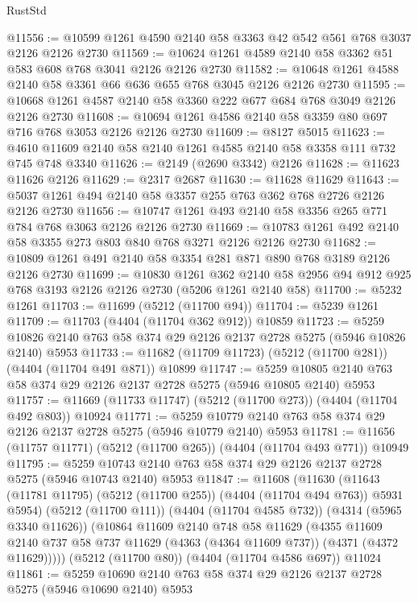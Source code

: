 \begin{lexlean}{RustStd}
\begin{coremodule}
{\begin{coremodule}
{{{{{{{{{{{{{{{{@11556 := @10599 @1261 @4590 @2140 @58 @3363 @42 @542 @561 @768 @3037 @2126 @2126 @2730
@11569 := @10624 @1261 @4589 @2140 @58 @3362 @51 @583 @608 @768 @3041 @2126 @2126 @2730
@11582 := @10648 @1261 @4588 @2140 @58 @3361 @66 @636 @655 @768 @3045 @2126 @2126 @2730
@11595 := @10668 @1261 @4587 @2140 @58 @3360 @222 @677 @684 @768 @3049 @2126 @2126 @2730
@11608 := @10694 @1261 @4586 @2140 @58 @3359 @80 @697 @716 @768 @3053 @2126 @2126 @2730
@11609 := @8127 @5015
@11623 := @4610 @11609 @2140 @58 @2140 @1261 @4585 @2140 @58 @3358 @111 @732 @745 @748 @3340
@11626 := @2149 (@2690 @3342) @2126
@11628 := @11623 @11626 @2126
@11629 := @2317 @2687
@11630 := @11628 @11629
@11643 := @5037 @1261 @494 @2140 @58 @3357 @255 @763 @362 @768 @2726 @2126 @2126 @2730
@11656 := @10747 @1261 @493 @2140 @58 @3356 @265 @771 @784 @768 @3063 @2126 @2126 @2730
@11669 := @10783 @1261 @492 @2140 @58 @3355 @273 @803 @840 @768 @3271 @2126 @2126 @2730
@11682 := @10809 @1261 @491 @2140 @58 @3354 @281 @871 @890 @768 @3189 @2126 @2126 @2730
@11699 := @10830
    @1261
    @362
    @2140
    @58
    @2956
    @94
    @912
    @925
    @768
    @3193
    @2126
    @2126
    @2730
    (@5206 @1261 @2140 @58)
@11700 := @5232 @1261
@11703 := @11699 (@5212 (@11700 @94))
@11704 := @5239 @1261
@11709 := @11703 (@4404 (@11704 @362 @912)) @10859
@11723 := @5259 @10826 @2140 @763 @58 @374 @29 @2126 @2137 @2728 @5275 (@5946 @10826 @2140) @5953
@11733 := @11682 (@11709 @11723) (@5212 (@11700 @281)) (@4404 (@11704 @491 @871)) @10899
@11747 := @5259 @10805 @2140 @763 @58 @374 @29 @2126 @2137 @2728 @5275 (@5946 @10805 @2140) @5953
@11757 := @11669 (@11733 @11747) (@5212 (@11700 @273)) (@4404 (@11704 @492 @803)) @10924
@11771 := @5259 @10779 @2140 @763 @58 @374 @29 @2126 @2137 @2728 @5275 (@5946 @10779 @2140) @5953
@11781 := @11656 (@11757 @11771) (@5212 (@11700 @265)) (@4404 (@11704 @493 @771)) @10949
@11795 := @5259 @10743 @2140 @763 @58 @374 @29 @2126 @2137 @2728 @5275 (@5946 @10743 @2140) @5953
@11847 := @11608
    (@11630
      (@11643 (@11781 @11795) (@5212 (@11700 @255)) (@4404 (@11704 @494 @763)) @5931 @5954)
      (@5212 (@11700 @111))
      (@4404 (@11704 @4585 @732))
      (@4314 (@5965 @3340 @11626))
      (@10864
        @11609
        @2140
        @748
        @58
        @11629
        (@4355
          @11609
          @2140
          @737
          @58
          @737
          @11629
          (@4363 (@4364 @11609 @737))
          (@4371 (@4372 @11629)))))
    (@5212 (@11700 @80))
    (@4404 (@11704 @4586 @697))
    @11024
@11861 := @5259 @10690 @2140 @763 @58 @374 @29 @2126 @2137 @2728 @5275 (@5946 @10690 @2140) @5953
}}}}}}}}}}}}}}}}
\end{coremodule}}
\end{coremodule}
\end{lexlean}
